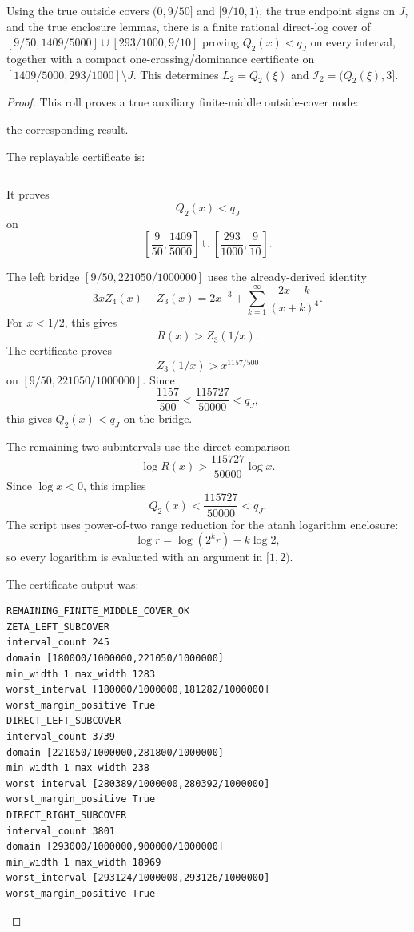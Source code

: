 \begin{proposition}
\label{res:q2-remaining-finite-middle-log-cover-terminal-certificate}
Using the true outside covers \((0,9/50]\) and \([9/10,1)\), the true endpoint signs on \(J\), and the true enclosure lemmas, there is a finite rational direct-log cover of \([9/50,1409/5000]\cup[293/1000,9/10]\) proving \(Q_2(x)<q_J\) on every interval, together with a compact one-crossing/dominance certificate on \([1409/5000,293/1000]\setminus J\). This determines \(L_2=Q_2(\xi)\) and \(\mathcal I_2=(Q_2(\xi),3]\).
\end{proposition}
\begin{proof}
This roll proves a true auxiliary finite-middle outside-cover node:

the corresponding result.

The replayable certificate is:

\begin{verbatim}
\end{verbatim}

It proves
\[
Q_2(x)<q_J
\]
on
\[
\left[\frac9{50},\frac{1409}{5000}\right]
\cup
\left[\frac{293}{1000},\frac9{10}\right].
\]

The left bridge \([9/50,221050/1000000]\) uses the already-derived identity
\[
3xZ_4(x)-Z_3(x)
=2x^{-3}+\sum_{k=1}^{\infty}\frac{2x-k}{(x+k)^4}.
\]
For \(x<1/2\), this gives
\[
R(x)>Z_3(1/x).
\]
The certificate proves
\[
Z_3(1/x)>x^{1157/500}
\]
on \([9/50,221050/1000000]\). Since
\[
\frac{1157}{500}<\frac{115727}{50000}<q_J,
\]
this gives \(Q_2(x)<q_J\) on the bridge.

The remaining two subintervals use the direct comparison
\[
\log R(x)>\frac{115727}{50000}\log x.
\]
Since \(\log x<0\), this implies
\[
Q_2(x)<\frac{115727}{50000}<q_J.
\]
The script uses power-of-two range reduction for the atanh logarithm enclosure:
\[
\log r=\log(2^k r)-k\log 2,
\]
so every logarithm is evaluated with an argument in \([1,2)\).

The certificate output was:

\begin{verbatim}
REMAINING_FINITE_MIDDLE_COVER_OK
ZETA_LEFT_SUBCOVER
interval_count 245
domain [180000/1000000,221050/1000000]
min_width 1 max_width 1283
worst_interval [180000/1000000,181282/1000000]
worst_margin_positive True
DIRECT_LEFT_SUBCOVER
interval_count 3739
domain [221050/1000000,281800/1000000]
min_width 1 max_width 238
worst_interval [280389/1000000,280392/1000000]
worst_margin_positive True
DIRECT_RIGHT_SUBCOVER
interval_count 3801
domain [293000/1000000,900000/1000000]
min_width 1 max_width 18969
worst_interval [293124/1000000,293126/1000000]
worst_margin_positive True
\end{verbatim}


\end{proof}
